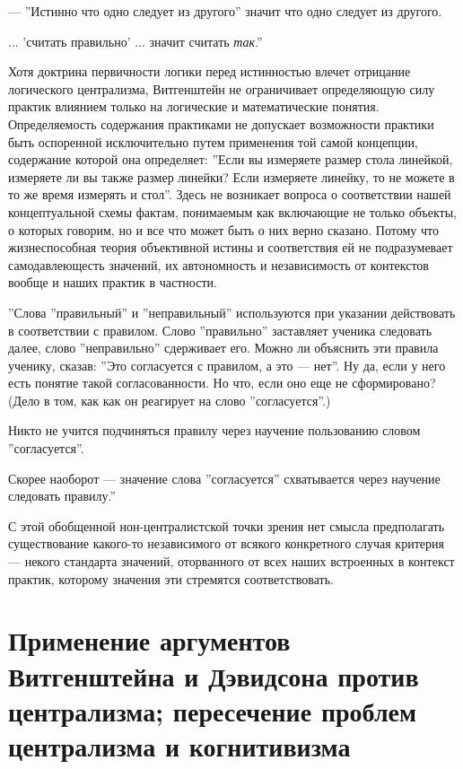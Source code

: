 \documentclass[11pt]{book}
\begin{document}
--- ''Истинно что одно следует из другого'' значит что одно следует из другого.

... 'считать правильно' ... значит считать \textit{так}.''

\smallskip

Хотя доктрина первичности логики перед истинностью влечет отрицание логического централизма, Витгенштейн не ограничивает определяющую силу практик влиянием только на логические и математические понятия. Определяемость содержания практиками не допускает возможности практики быть оспоренной исключительно путем применения той самой концепции, содержание которой она определяет: ''Если вы измеряете размер стола линейкой, измеряете ли вы также размер линейки? Если измеряете линейку, то не можете в то же время измерять и стол''. Здесь не возникает вопроса о соответствии нашей концептуальной схемы фактам, понимаемым как включающие не только объекты, о которых говорим, но и все что может быть о них верно сказано. Потому что жизнеспособная теория объективной истины и соответствия ей не подразумевает самодавлеющесть значений, их автономность и независимость от контекстов вообще и наших практик в частности.

\smallskip

''Слова ''правильный'' и ''неправильный'' используются при указании действовать в соответствии с правилом. Слово ''правильно'' заставляет ученика следовать далее, слово ''неправильно'' сдерживает его. Можно ли объяснить эти правила ученику, сказав: ''Это согласуется с правилом, а это --- нет''. Ну да, если у него есть понятие такой согласованности. Но что, если оно еще не сформировано? (Дело в том, как как он реагирует на слово ''согласуется''.)

Никто не учится подчиняться правилу через научение пользованию словом ''согласуется''.

Скорее наоборот --- значение слова ''согласуется'' схватывается через научение следовать правилу.''

\smallskip

С этой обобщенной нон-централистской точки зрения нет смысла предполагать существование какого-то независимого от всякого конкретного случая критерия --- некого стандарта значений, оторванного от всех наших встроенных в контекст практик, которому значения эти стремятся соответствовать.

\section{Применение аргументов Витгенштейна и Дэвидсона против централизма; пересечение проблем централизма и когнитивизма}
\end{document}
